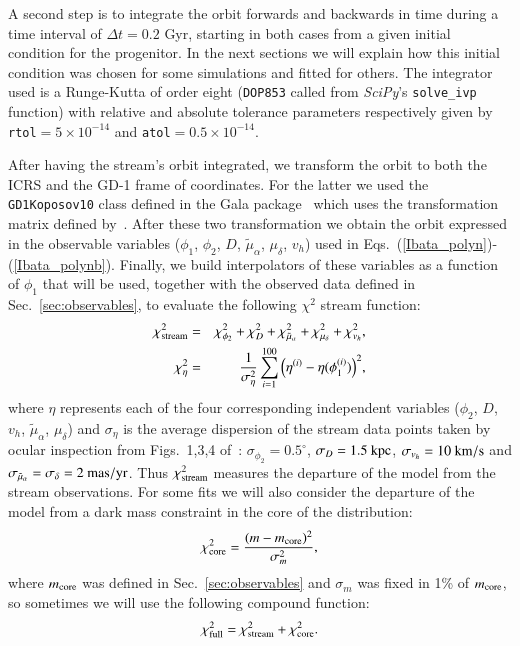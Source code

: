 \documentclass[twocolumn]{aa}
\begin{document}
A second step is to integrate the orbit forwards and backwards in time during a time interval of $\Delta t=0.2$ Gyr, starting in both cases from a given initial condition for the progenitor. In the next sections
we will explain how this initial condition was chosen for some simulations and fitted for others. The integrator used is a Runge-Kutta of order eight (\texttt{DOP853} called from {\it SciPy}'s \texttt{solve\_ivp} function) with relative and absolute tolerance parameters respectively given by
\texttt{rtol}$=5\times10^{-14}$ and \texttt{atol}$=0.5\times10^{-14}$.

After having the stream's orbit integrated, we transform the orbit to both the ICRS and the GD-1 frame of coordinates. For the latter we used the \texttt{GD1Koposov10} class defined in the Gala package~\citep{gala,adrian_price_whelan_2020_4159870} which uses the transformation matrix defined
by~\citet{Koposov_2010}.
After these two transformation we obtain the orbit expressed in the observable variables ($\phi_1$, $\phi_2$, $D$, $\tilde{\mu}_\alpha$, $\mu_\delta$, $v_h$) used in Eqs.~(\ref{Ibata_polyn})-(\ref{Ibata_polynb}).
Finally, we build interpolators of these variables as a function of $\phi_1$ that will be used, together with the observed data defined in Sec.~\ref{sec:observables}, to evaluate the following $\chi^2$ stream function:
\begin{eqnarray}
   \label{chi2}
   \chi^2_{\rm{stream}} &=& \chi^2_{\phi_2} + \chi^2_{D}+ \chi^2_{\tilde{\mu}_\alpha}+ \chi^2_{\mu_\delta}+\chi^2_{v_h},\\
   \chi^2_{\eta} &=& \frac{1}{\sigma_\eta^2}\sum_{i=1}^{100} \Big(\eta^{(i)}-\eta(\phi_1^{(i)})\Big)^2,
\end{eqnarray}
where
$\eta$ represents each of the four corresponding independent variables ($\phi_2$, $D$, $v_h$, $\tilde{\mu}_\alpha$, $\mu_\delta$) and $\sigma_\eta$ is the average dispersion of the stream data points taken by
ocular inspection from Figs.~1,3,4 of~\citet{Ibata_2020}:
$\sigma_{\phi_2}=0.5^\circ$,
$\sigma_{D}= 1.5~\rm{kpc}$,
$\sigma_{v_h} = 10~\rm{km/s}$ and
$\sigma_{\tilde{\mu}_\alpha}= \sigma_{\delta}= 2~\rm{mas/yr}$.
Thus $\chi^2_{\rm{stream}}$ measures the departure of the model from the stream observations.
For some fits we will also consider the departure of the model from a dark mass constraint in the core
of the distribution:
\begin{equation}
   \label{m_core}
   \chi^2_{\rm{core}}=\frac{(m-m_{\rm{core}})^2}{\sigma_m^2},
\end{equation}
where $m_{\rm{core}}$ was defined in Sec.~\ref{sec:observables} and
$\sigma_m$ was fixed in 1\% of $m_{\rm{core}}$, so sometimes we will use the following compound function:
\begin{equation}
   \label{chi2_full}
   \chi^2_{\rm{full}}=\chi^2_{\rm{stream}}+\chi^2_{\rm{core}}.
\end{equation}
\end{document}
